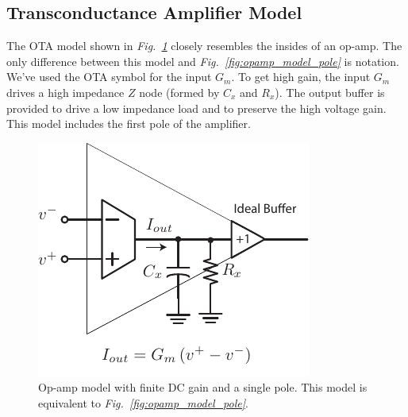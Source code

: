 \subsection{Transconductance Amplifier Model}
The OTA model shown in \emph{Fig.~\ref{fig:opamp_ota_model_gain}} closely resembles the insides of an op-amp.  The only difference between this model and \emph{Fig.~\ref{fig:opamp_model_pole}} is notation.  We've used the OTA symbol for the input $G_m$.  To get high gain, the input $G_m$ drives a high impedance $Z$ node (formed by $C_x$ and $R_x$). The output buffer is provided to drive a low impedance load and to preserve the high voltage gain.  This model includes the first pole of the amplifier.
\vspace{1cm}
%
%
\begin{figure}[H]
\centering
\includegraphics[width=.65\columnwidth]{opamp_ota_model_gain}
\caption{Op-amp model with finite DC gain and a single pole. This model is equivalent to \emph{Fig.~\ref{fig:opamp_model_pole}}.}
\label{fig:opamp_ota_model_gain}
\end{figure}
